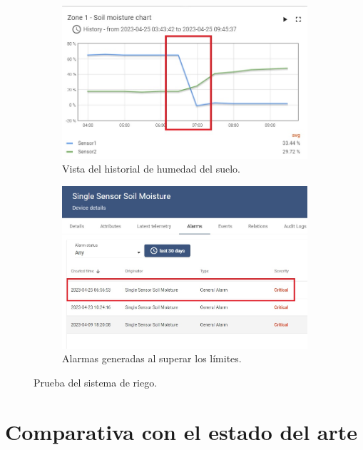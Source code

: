 \begin{figure}[!h]
     \centering
       \begin{subfigure}[b]{0.8\textwidth}
	    \centering
		 \includegraphics[width=\textwidth]{./Figures/chapter4/soil_chart.jpg}
		\caption{Vista del historial de humedad del suelo.}
		\label{fig:soil_graph}
     \end{subfigure}
          \hfill
     \begin{subfigure}[b]{0.80\textwidth}
		\centering
		\includegraphics[width=\textwidth]{./Figures/chapter4/soil_alarm.jpg}
		\caption{Alarmas generadas al superar los límites.}
		\label{fig:soil_alarm}
     \end{subfigure}
     \hfill
        \caption[Prueba del sistema de riego]{Prueba del sistema de riego.}
        \label{fig:tb_riego}
\end{figure}

\pagebreak
\section{Comparativa con el estado del arte}
\label{sec:Comparativa con el estado del arte}

